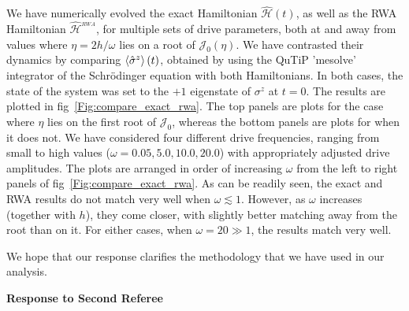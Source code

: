 \documentclass[aps,prb,reprint,showpacs,floatfix,superscriptaddress, onecolumn, 9pt]{revtex4-2}
\begin{document}
\begin{enumerate}
{We have numerically evolved the exact Hamiltonian $\hat{\mathcal{H}}(t)$, as well as the RWA Hamiltonian $\hat{\mathcal{H}}^{_{RWA}}$, for multiple sets of drive parameters, both at and away from values where $\eta=2h/\omega$ lies on a root of $\mathcal{J}_0(\eta)$. We have contrasted their dynamics by comparing $\expval{\hat{\sigma}^z}(t)$, obtained by using the QuTiP 'mesolve' integrator of the Schr\"odinger equation with both Hamiltonians. In both cases, the state of the system was set to the $+1$ eigenstate of $\sigma^z$ at $t=0$. The results are plotted in fig~\ref{Fig:compare_exact_rwa}. The top panels are plots for the case where $\eta$ lies on the first root of $\mathcal{J}_0$, whereas the bottom panels are plots for when it does not. We have considered four different drive frequencies, ranging from small to high values ($\omega = 0.05, 5.0, 10.0, 20.0$) with appropriately adjusted drive amplitudes. The plots are arranged in order of increasing $\omega$ from the left to right panels of fig~\ref{Fig:compare_exact_rwa}. As can be readily seen, the exact and RWA results do not match very well when $\omega \lesssim 1$. However, as $\omega$ increases (together with $h$), they come closer, with slightly better matching away from the root than on it. For either cases, when $\omega=20 \gg 1$, the results match very well.
    
    We hope that our response clarifies the methodology that we have used in our analysis.
    }
\end{enumerate}
  
\noindent \textbf{Response to Second Referee}
\end{document}
